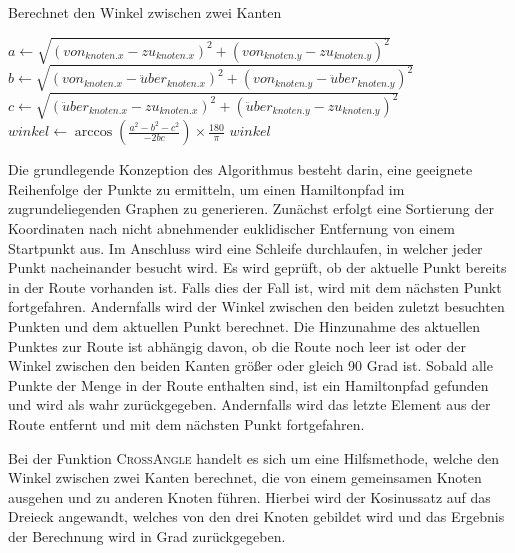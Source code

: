 \documentclass[a4paper,10pt,ngerman]{scrartcl}
\begin{document}
    \begin{algorithm}
        \caption{Berechnet den Winkel zwischen zwei Kanten}
        \begin{algorithmic}
                \State $\textit{a}\gets \sqrt{(von_{knoten.x} - zu_{knoten.x})^2 + (von_{knoten.y} - zu_{knoten.y})^2}$
                \State $\textit{b}\gets \sqrt{(von_{knoten.x} - \ddot uber_{knoten.x})^2 + (von_{knoten.y} - \ddot uber_{knoten.y})^2}$
                \State $\textit{c}\gets \sqrt{(\ddot uber_{knoten.x} - zu_{knoten.x})^2 + (\ddot uber_{knoten.y} - zu_{knoten.y})^2}$
                \State $\textit{winkel} \gets \arccos\left(\frac{a^2 - b^2 - c^2}{-2bc}\right) \times \frac{180}{\pi}$
                \State \Return $winkel$
            \EndFunction
        \end{algorithmic}\label{alg:algorithm2}
    \end{algorithm}

    Die grundlegende Konzeption des Algorithmus besteht darin, eine geeignete Reihenfolge der Punkte zu ermitteln,
    um einen Hamiltonpfad im zugrundeliegenden Graphen zu generieren.
    Zunächst erfolgt eine Sortierung der Koordinaten nach nicht abnehmender euklidischer Entfernung von einem Startpunkt aus.
    Im Anschluss wird eine Schleife durchlaufen, in welcher jeder Punkt nacheinander besucht wird.
    Es wird geprüft, ob der aktuelle Punkt bereits in der Route vorhanden ist.
    Falls dies der Fall ist, wird mit dem nächsten Punkt fortgefahren.
    Andernfalls wird der Winkel zwischen den beiden zuletzt besuchten Punkten und dem aktuellen Punkt berechnet.
    Die Hinzunahme des aktuellen Punktes zur Route ist abhängig davon,
    ob die Route noch leer ist oder der Winkel zwischen den beiden Kanten größer oder gleich 90 Grad ist.
    Sobald alle Punkte der Menge in der Route enthalten sind, ist ein Hamiltonpfad gefunden und wird als wahr zurückgegeben.
    Andernfalls wird das letzte Element aus der Route entfernt und mit dem nächsten Punkt fortgefahren.

    Bei der Funktion \textsc{CrossAngle} handelt es sich um eine Hilfsmethode, welche den Winkel zwischen zwei Kanten berechnet,
    die von einem gemeinsamen Knoten ausgehen und zu anderen Knoten führen.
    Hierbei wird der Kosinussatz auf das Dreieck angewandt, welches von den drei Knoten gebildet wird
    und das Ergebnis der Berechnung wird in Grad zurückgegeben.

    \newpage
\end{document}
